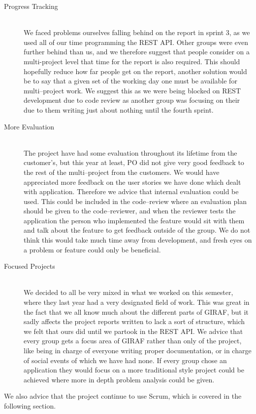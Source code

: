 \begin{description}
	\item[Progress Tracking] \hfill \\
	We faced problems ourselves falling behind on the report in sprint 3, as we used all of our time programming the REST API.
	Other groups were even further behind than us, and we therefore suggest that people consider on a multi-project level that time for the report is also required.
	This should hopefully reduce how far people get on the report, another solution would be to say that a given set of the working day one must be available for multi--project work.
	We suggest this as we were being blocked on REST development due to code review as another group was focusing on their due to them writing just about nothing until the fourth sprint.

	\item[More Evaluation] \hfill \\
	The project have had some evaluation throughout its lifetime from the customer's, but this year at least, PO did not give very good feedback to the rest of the multi--project from the customers.
	We would have appreciated more feedback on the user stories we have done which dealt with application.
	Therefore we advice that internal evaluation could be used.
	This could be included in the code--review where an evaluation plan should be given to the code--reviewer, and when the reviewer tests the application the person who implemented the feature would sit with them and talk about the feature to get feedback outside of the group.
	We do not think this would take much time away from development, and fresh eyes on a problem or feature could only be beneficial.

	\item[Focused Projects] \hfill \\
	We decided to all be very mixed in what we worked on this semester, where they last year had a very designated field of work.
	This was great in the fact that we all know much about the different parts of GIRAF, but it sadly affects the project reports written to lack a sort of structure, which we felt that ours did until we partook in the REST API.
	We advice that every group gets a focus area of GIRAF rather than only of the project, like being in charge of everyone writing proper documentation, or in charge of social events of which we have had none.
	If every group chose an application they would focus on a more traditional style project could be achieved where more in depth problem analysis could be given.
\end{description}
We also advice that the project continue to use Scrum, which is covered in the following section.


